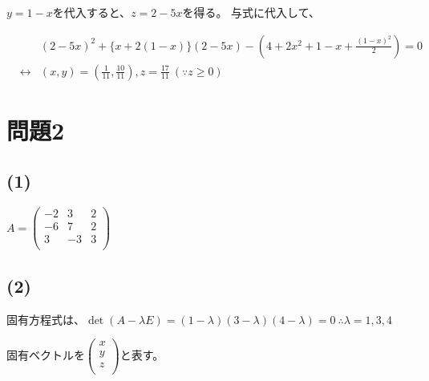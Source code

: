 \documentclass[]{jsarticle}
\begin{document}
        $y = 1 - x$を代入すると、$z = 2 - 5x$を得る。
        与式に代入して、

        \begin{eqnarray}
            &&(2 - 5x)^2 + \{x + 2(1 - x)\}(2 - 5x) - (4 + 2x^2+ 1 - x + \frac{(1 - x)^2}{2}) = 0 \nonumber \\
            &\leftrightarrow& (x, y) = \left(\frac{1}{11}, \frac{10}{11}\right), z = \frac{17}{11} \ (\because z \geq 0) \nonumber
        \end{eqnarray}
\section*{問題2}
    \subsection*{(1)}
        $A = \begin{pmatrix}
            -2 & 3 & 2 \\
            -6 & 7 & 2 \\
            3 & -3 & 3 \\
        \end{pmatrix}$
    \subsection*{(2)}
        固有方程式は、$\det (A - \lambda E) = (1 - \lambda)(3 - \lambda)(4 - \lambda) = 0 \ \therefore \lambda = 1, 3, 4$

        固有ベクトルを$
        \begin{pmatrix}
            x \\
            y \\
            z \\
        \end{pmatrix}
        $と表す。
\end{document}
